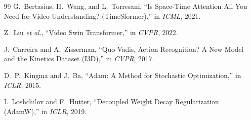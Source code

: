 \documentclass[10pt,conference]{IEEEtran}
\begin{document}
\begin{thebibliography}{99}
G.~Bertasius, H.~Wang, and L.~Torresani,
``Is Space-Time Attention All You Need for Video Understanding? (TimeSformer),''
in \textit{ICML}, 2021.

Z.~Liu \textit{et al.},
``Video Swin Transformer,''
in \textit{CVPR}, 2022.

J.~Carreira and A.~Zisserman,
``Quo Vadis, Action Recognition? A New Model and the Kinetics Dataset (I3D),''
in \textit{CVPR}, 2017.

D.~P.~Kingma and J.~Ba,
``Adam: A Method for Stochastic Optimization,''
in \textit{ICLR}, 2015.

I.~Loshchilov and F.~Hutter,
``Decoupled Weight Decay Regularization (AdamW),''
in \textit{ICLR}, 2019.

\end{thebibliography}
\end{document}
